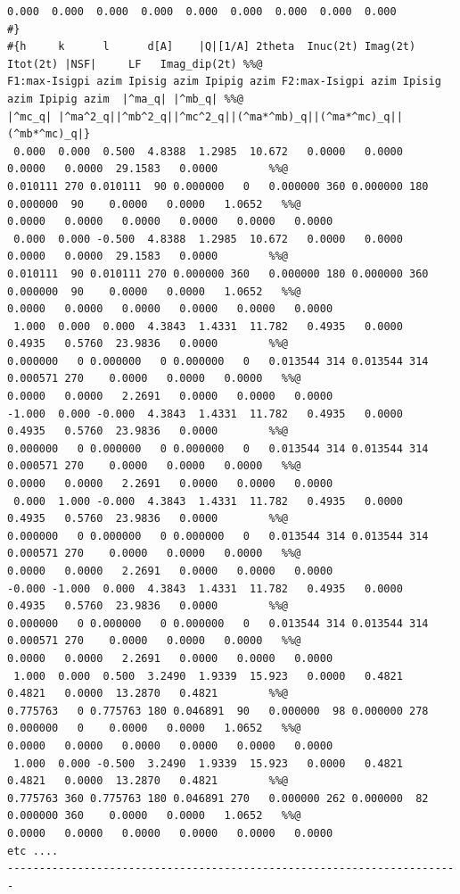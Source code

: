 {\begin{verbatim}
0.000  0.000  0.000  0.000  0.000  0.000  0.000  0.000  0.000 
#}
#{h     k      l      d[A]    |Q|[1/A] 2theta  Inuc(2t) Imag(2t) Itot(2t) |NSF|     LF   Imag_dip(2t) %%@
F1:max-Isigpi azim Ipisig azim Ipipig azim F2:max-Isigpi azim Ipisig azim Ipipig azim  |^ma_q| |^mb_q| %%@
|^mc_q| |^ma^2_q||^mb^2_q||^mc^2_q||(^ma*^mb)_q||(^ma*^mc)_q||(^mb*^mc)_q|}
 0.000  0.000  0.500  4.8388  1.2985  10.672   0.0000   0.0000   0.0000   0.0000  29.1583   0.0000        %%@
0.010111 270 0.010111  90 0.000000   0   0.000000 360 0.000000 180 0.000000  90    0.0000   0.0000   1.0652   %%@
0.0000   0.0000   0.0000   0.0000   0.0000   0.0000
 0.000  0.000 -0.500  4.8388  1.2985  10.672   0.0000   0.0000   0.0000   0.0000  29.1583   0.0000        %%@
0.010111  90 0.010111 270 0.000000 360   0.000000 180 0.000000 360 0.000000  90    0.0000   0.0000   1.0652   %%@
0.0000   0.0000   0.0000   0.0000   0.0000   0.0000
 1.000  0.000  0.000  4.3843  1.4331  11.782   0.4935   0.0000   0.4935   0.5760  23.9836   0.0000        %%@
0.000000   0 0.000000   0 0.000000   0   0.013544 314 0.013544 314 0.000571 270    0.0000   0.0000   0.0000   %%@
0.0000   0.0000   2.2691   0.0000   0.0000   0.0000
-1.000  0.000 -0.000  4.3843  1.4331  11.782   0.4935   0.0000   0.4935   0.5760  23.9836   0.0000        %%@
0.000000   0 0.000000   0 0.000000   0   0.013544 314 0.013544 314 0.000571 270    0.0000   0.0000   0.0000   %%@
0.0000   0.0000   2.2691   0.0000   0.0000   0.0000
 0.000  1.000 -0.000  4.3843  1.4331  11.782   0.4935   0.0000   0.4935   0.5760  23.9836   0.0000        %%@
0.000000   0 0.000000   0 0.000000   0   0.013544 314 0.013544 314 0.000571 270    0.0000   0.0000   0.0000   %%@
0.0000   0.0000   2.2691   0.0000   0.0000   0.0000
-0.000 -1.000  0.000  4.3843  1.4331  11.782   0.4935   0.0000   0.4935   0.5760  23.9836   0.0000        %%@
0.000000   0 0.000000   0 0.000000   0   0.013544 314 0.013544 314 0.000571 270    0.0000   0.0000   0.0000   %%@
0.0000   0.0000   2.2691   0.0000   0.0000   0.0000
 1.000  0.000  0.500  3.2490  1.9339  15.923   0.0000   0.4821   0.4821   0.0000  13.2870   0.4821        %%@
0.775763   0 0.775763 180 0.046891  90   0.000000  98 0.000000 278 0.000000   0    0.0000   0.0000   1.0652   %%@
0.0000   0.0000   0.0000   0.0000   0.0000   0.0000
 1.000  0.000 -0.500  3.2490  1.9339  15.923   0.0000   0.4821   0.4821   0.0000  13.2870   0.4821        %%@
0.775763 360 0.775763 180 0.046891 270   0.000000 262 0.000000  82 0.000000 360    0.0000   0.0000   1.0652   %%@
0.0000   0.0000   0.0000   0.0000   0.0000   0.0000
etc ....
-----------------------------------------------------------------------
\end{verbatim}
}

